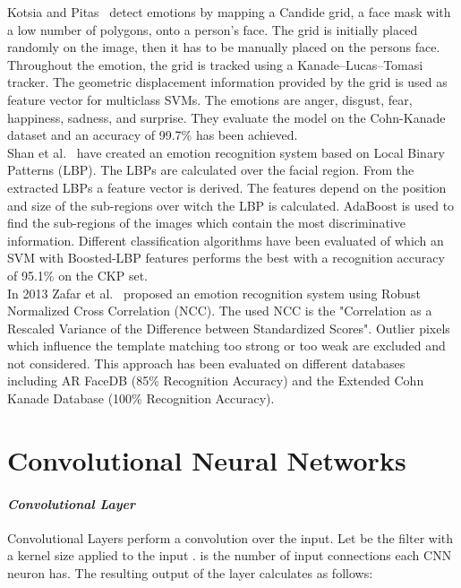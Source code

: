 \documentclass[10pt,journal,compsoc, hidelinks]{IEEEtran}
\newcommand{\paraV}{\vspace{1em}}
\begin{document}
Kotsia and Pitas~\cite{4032815} detect emotions by mapping a Candide grid, a face mask with a low number of polygons, onto a person's face. The grid is initially placed randomly on the image, then it has to be manually placed on the persons face. 
Throughout the emotion, the grid is tracked using a Kanade–Lucas–Tomasi tracker. The geometric displacement information provided by the grid is used as feature vector for multiclass SVMs. The emotions are anger, disgust, fear, happiness, sadness, and surprise. They evaluate the model on the Cohn-Kanade dataset and an accuracy of 99.7\% has been achieved.\\
Shan et al.~\cite{Shan2009803} have created an emotion recognition system based on Local Binary Patterns (LBP). The LBPs are calculated over the facial region. From the extracted LBPs a feature vector is derived. The features depend on the position and size of the sub-regions over witch the LBP is calculated. AdaBoost is used to find the sub-regions of the images which contain the most discriminative information. Different classification algorithms have been evaluated of which an SVM with Boosted-LBP features performs the best with a recognition accuracy of 95.1\% on the CKP set.\\
In 2013 Zafar et al.~\cite{6743520} proposed an emotion recognition system using Robust Normalized Cross Correlation (NCC). The used NCC is the "Correlation as a Rescaled Variance of the Difference between Standardized Scores". Outlier pixels which influence the template matching too strong or too weak are excluded and not considered. This approach has been evaluated on different databases including AR FaceDB (85\% Recognition Accuracy) and the Extended Cohn Kanade Database (100\% Recognition Accuracy).\\




 \section{Convolutional Neural Networks}
\label{sec:background}

\paraV
\paragraph{\textit{Convolutional Layer}}
Convolutional Layers perform a convolution over the input. Let  be the filter with a kernel size  applied to the input .  is the number of input connections each CNN neuron has. The resulting output of the layer calculates as follows: 
\end{document}
